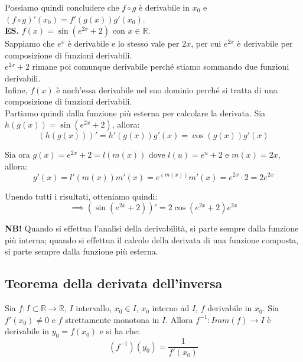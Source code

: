 \documentclass{article}
\begin{document}
\noindent Possiamo quindi concludere che $f \circ g$ è derivabile in $x_0$ e $(f \circ g)'(x_0) = f'(g(x))g'(x_0)$.\\

\noindent\textbf{ES.} $f(x) = \sin(e^{2x} + 2)$ con $x \in \mathbb{R}$. \\
Sappiamo che $e^x$ è derivabile e lo stesso vale per $2x$, per cui $e^{2x}$ è derivabile per composizione di funzioni derivabili.\\
$e^{2x} + 2$ rimane poi comunque derivabile perché stiamo sommando due funzioni derivabili. \\
Infine, $f(x)$ è anch'essa derivabile nel suo dominio perché si tratta di una composizione di funzioni derivabili.\\
Partiamo quindi dalla funzione più esterna per calcolare la derivata. Sia $h(g(x)) = \sin(e^{2x} + 2)$, allora:
\begin{equation*}
    (h(g(x)))' = h'(g(x))g'(x) = \cos(g(x)) g'(x)
\end{equation*}

\noindent Sia ora $g(x) = e^{2x} + 2 = l(m(x))$ dove $l(u) = e^u + 2$ e $m(x) = 2x$, allora:
\begin{equation*}
    g'(x) = l'(m(x)) m'(x) = e^{(m(x))}m'(x) = e^{2x} \cdot 2 = 2e^{2x}
\end{equation*}

\noindent Unendo tutti i risultati, otteniamo quindi:
\begin{equation*}
    \implies (\sin(e^{2x} + 2))' = 2\cos(e^{2x} + 2)e^{2x}
\end{equation*}

\noindent\textbf{NB!} Quando si effettua l'analisi della derivabilità, si parte sempre dalla funzione più interna; quando si effettua il calcolo della derivata di una funzione composta, si parte sempre dalla funzione più esterna.

\subsection{Teorema della derivata dell'inversa}
Sia $f: I \subset \mathbb{R} \xrightarrow{} \mathbb{R}$, $I$ intervallo, $x_0 \in I$, $x_0$ interno ad $I$, $f$ derivabile in $x_0$. Sia $f'(x_0) \neq 0$ e $f$ strettamente monotona in $I$. Allora $f^{-1}: Imm(f) \xrightarrow{} I$ è derivabile in $y_0 = f(x_0)$ e si ha che:
\begin{equation*}
   (f^{-1})(y_0) = \frac{1}{f'(x_0)}
\end{equation*}
\end{document}
